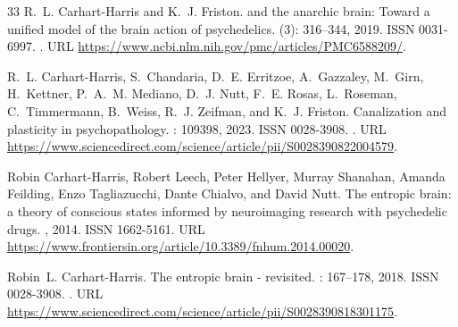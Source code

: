 \documentclass[12pt,fleqn]{article}
\begin{document}
\begin{thebibliography}{33}
  R.~L. Carhart-Harris and K.~J. Friston.
   and the anarchic brain: Toward a unified model of the brain
  action of psychedelics.
   (3): 316--344, 2019.
  \newblock ISSN 0031-6997.
  \newblock {}.
  \newblock URL \url{https://www.ncbi.nlm.nih.gov/pmc/articles/PMC6588209/}.

  R.~L. Carhart-Harris, S.~Chandaria, D.~E. Erritzoe, A.~Gazzaley, M.~Girn,
  H.~Kettner, P.~A.~M. Mediano, D.~J. Nutt, F.~E. Rosas, L.~Roseman,
  C.~Timmermann, B.~Weiss, R.~J. Zeifman, and K.~J. Friston.
  \newblock Canalization and plasticity in psychopathology.
  : 109398, 2023.
  \newblock ISSN 0028-3908.
  \newblock {}.
  \newblock URL
  \url{https://www.sciencedirect.com/science/article/pii/S0028390822004579}.

  Robin Carhart-Harris, Robert Leech, Peter Hellyer, Murray Shanahan, Amanda
  Feilding, Enzo Tagliazucchi, Dante Chialvo, and David Nutt.
  \newblock The entropic brain: a theory of conscious states informed by
  neuroimaging research with psychedelic drugs.
  , 2014.
  \newblock ISSN 1662-5161.
  \newblock URL
  \url{https://www.frontiersin.org/article/10.3389/fnhum.2014.00020}.

  Robin~L. Carhart-Harris.
  \newblock The entropic brain - revisited.
  : 167--178, 2018.
  \newblock ISSN 0028-3908.
  \newblock {}.
  \newblock URL
  \url{https://www.sciencedirect.com/science/article/pii/S0028390818301175}.


\end{thebibliography}
\end{document}
